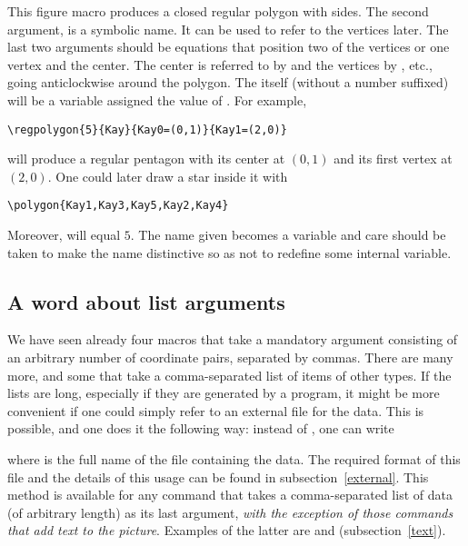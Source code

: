 \documentclass[letterpaper]{article}
\begin{document}
This figure macro produces a closed regular polygon with 
sides. The second argument,  is a symbolic name. It can be
used to refer to the vertices later. The last two arguments should be
equations that position two of the vertices or one vertex and the
center. The center is referred to by  and the vertices
by  , etc., going anticlockwise
around the polygon. The  itself (without a number suffixed)
will be a \MF{} variable assigned the value of . For example,
\begin{verbatim}
\regpolygon{5}{Kay}{Kay0=(0,1)}{Kay1=(2,0)}
\end{verbatim}
will produce a regular pentagon with its center at $(0,1)$ and its first
vertex at $(2,0)$. One could later draw a star inside it with
\begin{verbatim}
\polygon{Kay1,Kay3,Kay5,Kay2,Kay4}
\end{verbatim}
Moreover,  will equal $5$. The name given becomes a \MF{}
variable and care should be taken to make the name distinctive so as not
to redefine some internal variable.


\subsection{A word about list arguments}\label{list}

We have seen already four \mfp{} macros that take a mandatory argument
consisting of an arbitrary number of coordinate pairs, separated by
commas. There are many more, and some that take a comma-separated list
of items of other types. If the lists are long, especially if they are
generated by a program, it might be more convenient if one could simply
refer to an external file for the data. This is possible, and one does
it the following way: instead of , one
can write
\begin{ex}
\end{ex}
where  is the full name of the file containing the data.
The required format of this file and the details of this usage can be
found in subsection~\ref{external}. This method is available for any
command that takes a comma-separated list of data (of arbitrary length)
as its last argument, \emph{with the exception of those commands that
add text to the picture}. Examples of the latter are  and
 (subsection~\ref{text}).
\end{document}
